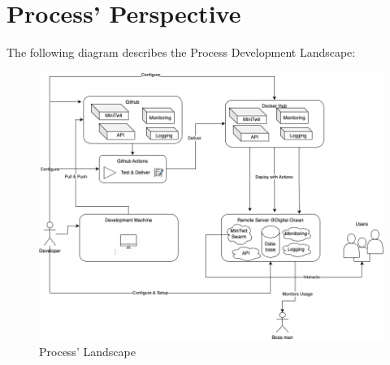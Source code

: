 \documentclass[11pt]{article}
\begin{document}
\section{Process' Perspective}
The following diagram describes the Process Development Landscape:
\begin{figure}[!h]
    \centering
    \includegraphics[width=\textwidth]{report/images/process.png}
    \caption{Process' Landscape}
    \label{fig:process-overview}
\end{figure}
\end{document}
